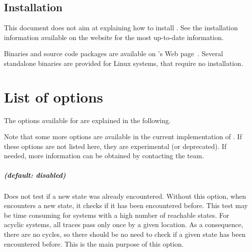 \section{Installation}

This document does not aim at explaining how to install \imitator{}.
See the installation information available on the website for the most up-to-date information.

Binaries and source code packages are available on \imitator{}'s Web page~\cite{imitator}.
Several standalone binaries are provided for Linux systems, that require no installation.








\chapter{List of options}\label{chapter:options}

The options available for \imitator{} are explained in the following.

Note that some more options are available in the current implementation of \imitator{}.
If these options are not listed here, they are experimental (or deprecated).
If needed, more information can be obtained by contacting the \imitator{} team.



\paragraph{ (default: disabled)}
Does not test if a new state was already encountered.
Without this option, when \imitator{} encounters a new state, it checks if it has been encountered before.
This test may be time consuming for systems with a high number of reachable states.
For acyclic systems, all traces pass only once by a given location.
As a consequence, there are no cycles, so there should be no need to check if a given state has been encountered before.
This is the main purpose of this option.

